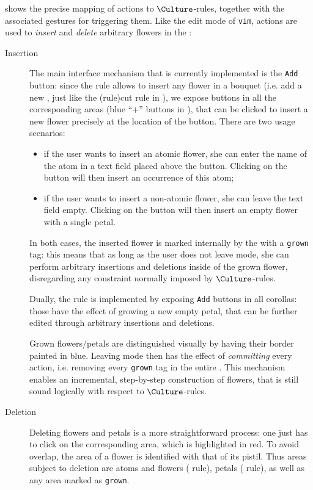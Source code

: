 \begin{scope}
 shows the precise mapping of \Edit actions to
$\Culture$-rules, together with the associated gestures for triggering them.
Like the edit mode of \texttt{vim}, \Edit actions are used to \emph{insert} and
\emph{delete} arbitrary flowers in the :
\begin{description}
  \item[Insertion] The main interface mechanism that is currently
  implemented is the \texttt{Add} button: since the  rule allows to
  insert any flower in a  bouquet (i.e. add a new , just like the
  \kl(rule){cut} rule in ), we expose buttons in all the corresponding
  areas (blue ``+'' buttons in ), that can be
  clicked to insert a new flower precisely at the location of the button. There
  are two usage scenarios:
  \begin{itemize}
    \item if the user wants to insert an atomic flower, she can enter the name
    of the atom in a text field placed above the button. Clicking on the button
    will then insert an occurrence of this atom;
    \item if the user wants to insert a non-atomic flower, she can leave the
    text field empty. Clicking on the button will then insert an empty flower
    with a single petal.
  \end{itemize}
  In both cases, the inserted flower is marked internally by the 
  with a \texttt{grown} tag: this means that as long as the user does not leave
  \Edit mode, she can perform arbitrary insertions and deletions inside of the
  grown flower, disregarding any  constraint normally imposed by
  $\Culture$-rules.
  
  Dually, the  rule is implemented by exposing \texttt{Add} buttons in
  all  corollas: those have the effect of growing a new empty petal,
  that can be further edited through arbitrary insertions and deletions.

  Grown flowers/petals are distinguished visually by having their border painted
  in blue. Leaving \Edit mode then has the effect of \emph{committing} every
  \Edit action, i.e. removing every \texttt{grown} tag in the entire . This
  mechanism enables an incremental, step-by-step construction of flowers, that
  is still sound logically with respect to $\Culture$-rules.

  \item[Deletion] Deleting flowers and petals is a more straightforward
  process: one just has to click on the corresponding area, which is highlighted
  in red. To avoid overlap, the area of a flower is identified with that of its
  pistil. Thus areas subject to deletion are  atoms and flowers
  ( rule),  petals ( rule), as well as any area
  marked as \texttt{grown}.
\end{description}


\end{scope}
